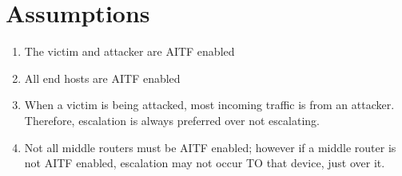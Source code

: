 \documentclass[11pt]{article}
\begin{document}
\section{Assumptions}
\begin{enumerate}
	\item The victim and attacker are AITF enabled
	\item All end hosts are AITF enabled
	\item When a victim is being attacked, most incoming traffic is from an attacker. Therefore, escalation is always preferred over not escalating.
	\item Not all middle routers must be AITF enabled; however if a middle router is not AITF enabled, escalation may not occur TO that device, just over it.
\end{enumerate}
\end{document}
